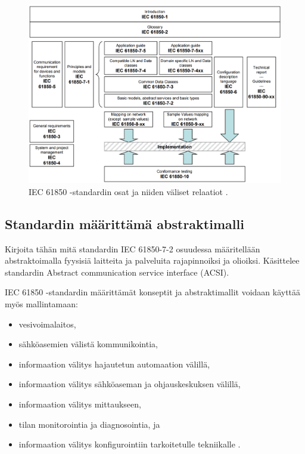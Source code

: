 \begin{figure}
	\includegraphics[width=1\textwidth]{pictures/iec-61850-series-and-relations.png}
	\caption{IEC 61850 -standardin osat ja niiden väliset relaatiot \cite[s.~14]{IEC61850-7-1}.}
	\label{fig:iec61850-osat-ja-relaatiot}
\end{figure}

\subsection{Standardin määrittämä abstraktimalli}
\begin{it}
	Kirjoita tähän mitä standardin IEC 61850-7-2 osuudessa määritellään abstraktoimalla fyysisiä laitteita ja palveluita rajapinnoiksi ja olioiksi. Käsittelee standardin Abstract communication service interface (ACSI).
\end{it}

IEC 61850 -standardin määrittämät konseptit ja abstraktimallit voidaan käyttää myös mallintamaan:
\begin{itemize}
	\item vesivoimalaitos,
	\item sähköasemien välistä kommunikointia,
	\item informaation välitys hajautetun automaation välillä,
	\item informaation välitys sähköaseman ja ohjauskeskuksen välillä,
	\item informaation välitys mittaukseen,
	\item tilan monitorointia ja diagnosointia, ja
	\item informaation välitys konfigurointiin tarkoitetulle tekniikalle \cite[s.~11]{IEC61850-7-1}.
\end{itemize}

